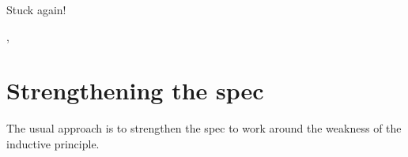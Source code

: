 \documentclass[a4paper]{article}
\begin{document}
Stuck again!

\begin{alectryon}
  \sep
  \begin{sentence}
    \begin{input}
    \end{input}
  \end{sentence}
\end{alectryon}


\section{Strengthening the spec%
  \label{strengthening-the-spec}%
}

The usual approach is to strengthen the spec to work around the weakness of the inductive principle.
\end{document}
